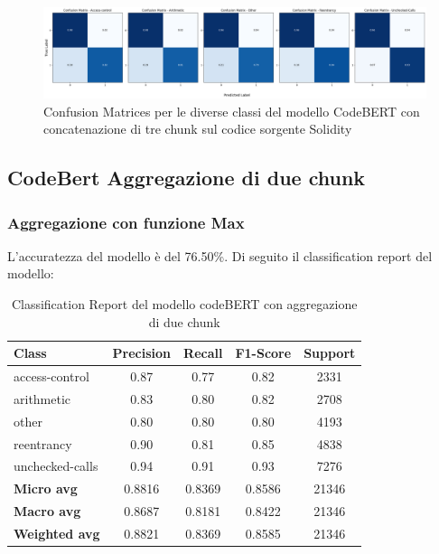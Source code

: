 \documentclass[../../Thesis.tex]{subfiles}
\begin{document}
\begin{figure}[H]
    \includegraphics[width=1.05\textwidth]{../../img/CFConcat3-SC.png}
    \caption{Confusion Matrices per le diverse classi del modello CodeBERT con concatenazione di tre chunk sul codice sorgente Solidity}
\end{figure}

\subsection{CodeBert Aggregazione di due chunk}
\subsubsection{Aggregazione con funzione Max}
L'accuratezza del modello \`e del 76.50\%. Di seguito il classification report del modello:

\begin{table}[H]
    \centering
    \small
    \begin{tabular}{lcccc}
    \hline
    \textbf{Class} & \textbf{Precision} & \textbf{Recall} & \textbf{F1-Score} & \textbf{Support} \\
    \hline
    access-control & 0.87 & 0.77 & 0.82 & 2331 \\
    arithmetic & 0.83 & 0.80 & 0.82 & 2708 \\
    other & 0.80 & 0.80 & 0.80 & 4193 \\
    reentrancy & 0.90 & 0.81 & 0.85 & 4838 \\
    unchecked-calls & 0.94 & 0.91 & 0.93 & 7276 \\
    \hline
    \textbf{Micro avg} & 0.8816 & 0.8369 & 0.8586 & 21346 \\
    \textbf{Macro avg} & 0.8687 & 0.8181 & 0.8422 & 21346 \\
    \textbf{Weighted avg} & 0.8821 & 0.8369 & 0.8585 & 21346 \\
    \hline
    \end{tabular}
    \caption{Classification Report del modello codeBERT con aggregazione di due chunk}
    \end{table}
\end{document}
